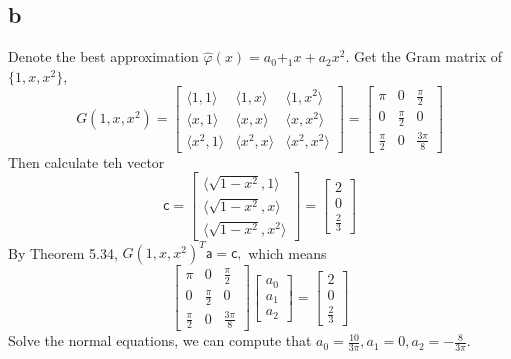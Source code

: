 \documentclass[a4paper]{article}
\begin{document}
\subsection*{b}
Denote the best approximation $\hat{\varphi}(x)=a_0+_1x+a_2x^2.$ Get the Gram matrix of $\{1, x, x^2\}$,
\begin{equation*}
  G(1, x, x^2) = 
  \left[
  \begin{matrix}
      \langle 1,1 \rangle & \langle 1,x \rangle & \langle 1,x^2 \rangle \\
      \langle x,1 \rangle & \langle x,x \rangle & \langle x,x^2 \rangle \\
      \langle x^2,1 \rangle & \langle x^2,x \rangle & \langle x^2,x^2 \rangle
  \end{matrix}
  \right]
  = 
  \left[
  \begin{matrix}
      \pi & 0 & \frac{\pi}{2} \\
      0 & \frac{\pi}{2} & 0 \\
      \frac{\pi}{2} & 0 & \frac{3\pi}{8}
  \end{matrix}
  \right]
\end{equation*}
Then calculate teh vector
\begin{equation*}
  \mathsf{c} =
  \left[
  \begin{matrix}
      \langle \sqrt{1-x^2},1 \rangle \\
      \langle \sqrt{1-x^2},x \rangle \\
      \langle \sqrt{1-x^2},x^2 \rangle
  \end{matrix}
  \right]
  =
  \left[
  \begin{matrix}
      2 \\ 0 \\ \frac{2}{3}
  \end{matrix}
  \right]
\end{equation*}
By Theorem 5.34, $G(1, x, x^2)^T\mathsf{a}=\mathsf{c},$ which means 
\begin{equation*}
  \left[
  \begin{matrix}
      \pi & 0 & \frac{\pi}{2} \\
      0 & \frac{\pi}{2} & 0 \\
      \frac{\pi}{2} & 0 & \frac{3\pi}{8}
  \end{matrix}
  \right]
  \left[
  \begin{matrix}
      a_0 \\ a_1 \\ a_2
  \end{matrix}
  \right]
  =
  \left[
  \begin{matrix}
      2 \\ 0 \\ \frac{2}{3}
  \end{matrix}
  \right]
\end{equation*}
Solve the normal equations, we can compute that 
$a_0=\frac{10}{3\pi},a_1=0,a_2=-\frac{8}{3\pi}.$ 
\end{document}
